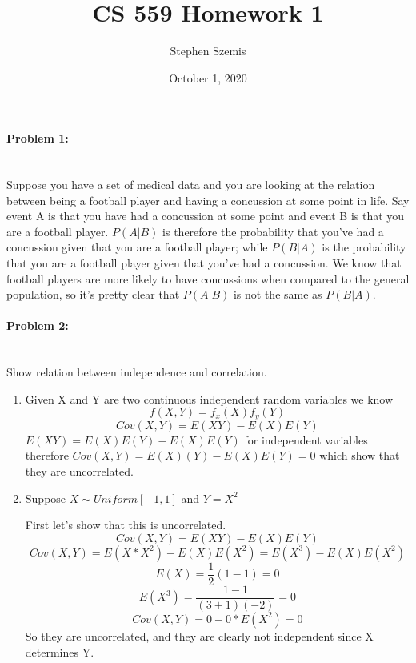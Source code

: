 \documentclass[12pt]{article}
\begin{document}
    \title{CS 559 Homework 1}
    \author{Stephen Szemis}
    \date{October 1, 2020}
    \maketitle

    \paragraph{Problem 1:} ~\\
    Suppose you have a set of medical data and you are looking at the relation 
    between being a football player and having a concussion at some point in life. 
    Say event A is that you have had a concussion at some point and event B is that 
    you are a football player. \(P(A | B)\) is therefore the probability that you’ve 
    had a concussion given that you are a football player; while \(P(B | A)\) is the 
    probability that you are a football player given that you’ve had a concussion. 
    We know that football players are more likely to have concussions when compared 
    to the general population, so it’s pretty clear that \(P(A | B)\) is not the same 
    as \(P(B | A)\).

    \paragraph{Problem 2:} ~\\
    Show relation between independence and correlation.
    \begin{enumerate}
        \item 
        Given X and Y are two continuous independent random variables we know
        \[ f(X, Y) = f_x(X)f_y(Y) \]
        \[ Cov(X, Y) = E(XY)-E(X)E(Y) \]
        \(E(XY)=E(X)E(Y) - E(X)E(Y)\) for independent variables therefore
        \(Cov(X,Y) = E(X)(Y) - E(X)E(Y) = 0\) which show that they are uncorrelated.
        \item
        Suppose \(X \sim Uniform[-1, 1]\) and \(Y = X^2\)

        First let's show that this is uncorrelated.
        \[ Cov(X,Y) = E(XY) - E(X)E(Y) \]
        \[ Cov(X,Y) = E(X*X^2) - E(X)E(X^2) = E(X^3)  - E(X)E(X^2) \]
        \[ E(X) = \frac{1}{2}(1 - 1) = 0 \]
        \[ E(X^3) = \frac{1 - 1}{(3+1)(-2)} = 0 \]
        \[ Cov(X,Y) = 0 - 0*E(X^2) = 0 \]
        So they are uncorrelated, and they are clearly not independent
        since X determines Y.
    \end{enumerate}
\end{document}
